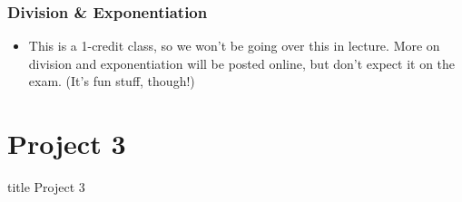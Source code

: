 \documentclass{beamer}
\begin{document}
    	
    	\begin{frame}
    		\frametitle{Division \& Exponentiation}
    		\begin{itemize}
    			\item This is a 1-credit class, so we won't be going over this in lecture. More on division and exponentiation will be posted online, but don't expect it on the exam. (It's fun stuff, though!)
    		\end{itemize}
    	\end{frame}
    	
    	
    	
    	
    	
    \section{Project 3}
    
    	\begin{frame}
                \vfill
                \centering
                \begin{beamercolorbox}[sep=8pt,center,shadow=true,rounded=true]{title}
                    Project 3\par%
                \end{beamercolorbox}
                \vfill
             \end{frame}
   
    
\end{document}
